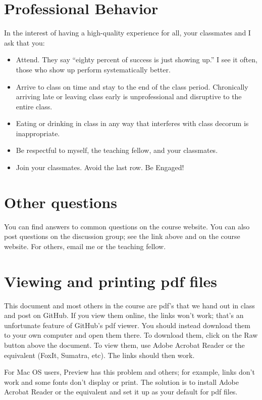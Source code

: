 \section*{Professional Behavior}
In the interest of having a high-quality experience for all, your classmates and I ask that you:
\begin{itemize}
\item Attend. They say ``eighty percent of success is just showing up.'' I see it often, those who show up perform systematically better.

\item Arrive to class on time and stay to the end of the class period. Chronically arriving late or leaving class early is unprofessional and disruptive to the entire class.

\item Eating or drinking in class in any way that interferes with class decorum is inappropriate.

\item Be respectful to myself, the teaching fellow, and your classmates.

\item Join your classmates. Avoid the last row. Be Engaged!
\end{itemize}


\section*{Other questions}

You can find answers to common questions on the course website. You can also post questions on the discussion group; see the link above and on the course website. For others, email me or the teaching fellow.


\section*{Viewing and printing pdf files}

This document and most others in the course are pdf's that we hand out in class and post on GitHub.
If you view them online, the links won't work; that's an unfortunate feature of GitHub's pdf viewer.
You should instead download them to your own computer and open them there.
To download them, click on the Raw button above the document.
To view them, use Adobe Acrobat Reader or the equivalent (FoxIt, Sumatra, etc).
The links should then work.

For Mac OS users, Preview has this problem and others; for example,
links don't work and some fonts don't display or print.
The solution is to install Adobe Acrobat Reader or the equivalent
and set it up as your default for pdf files.


